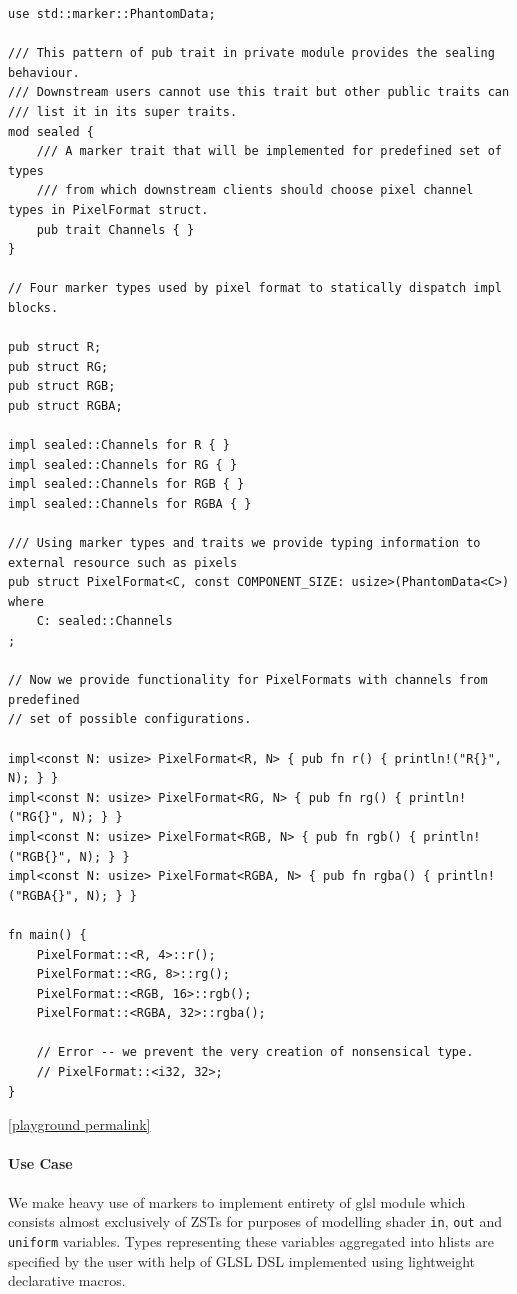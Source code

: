 \begin{lstlisting}
use std::marker::PhantomData;

/// This pattern of pub trait in private module provides the sealing behaviour.
/// Downstream users cannot use this trait but other public traits can
/// list it in its super traits.
mod sealed {
    /// A marker trait that will be implemented for predefined set of types
    /// from which downstream clients should choose pixel channel types in PixelFormat struct.
    pub trait Channels { }
}

// Four marker types used by pixel format to statically dispatch impl blocks.

pub struct R;
pub struct RG;
pub struct RGB;
pub struct RGBA;

impl sealed::Channels for R { }
impl sealed::Channels for RG { }
impl sealed::Channels for RGB { }
impl sealed::Channels for RGBA { }

/// Using marker types and traits we provide typing information to external resource such as pixels
pub struct PixelFormat<C, const COMPONENT_SIZE: usize>(PhantomData<C>)
where 
    C: sealed::Channels
;

// Now we provide functionality for PixelFormats with channels from predefined
// set of possible configurations.

impl<const N: usize> PixelFormat<R, N> { pub fn r() { println!("R{}", N); } }
impl<const N: usize> PixelFormat<RG, N> { pub fn rg() { println!("RG{}", N); } }
impl<const N: usize> PixelFormat<RGB, N> { pub fn rgb() { println!("RGB{}", N); } }
impl<const N: usize> PixelFormat<RGBA, N> { pub fn rgba() { println!("RGBA{}", N); } }

fn main() {
    PixelFormat::<R, 4>::r();
    PixelFormat::<RG, 8>::rg();
    PixelFormat::<RGB, 16>::rgb();
    PixelFormat::<RGBA, 32>::rgba();
    
    // Error -- we prevent the very creation of nonsensical type.
    // PixelFormat::<i32, 32>;
}
\end{lstlisting}
\noindent \href{https://play.rust-lang.org/?version=stable&mode=debug&edition=2021&gist=7d092a3be5593833894fa27b5fa56757}{[playground permalink]}

\paragraph{Use Case}

We make heavy use of markers to implement entirety of glsl module which consists almost exclusively of ZSTs for purposes of modelling shader \texttt{in}, \texttt{out} and \texttt{uniform} variables.
Types representing these variables aggregated into hlists are specified by the user with help of GLSL DSL implemented using lightweight declarative macros.

